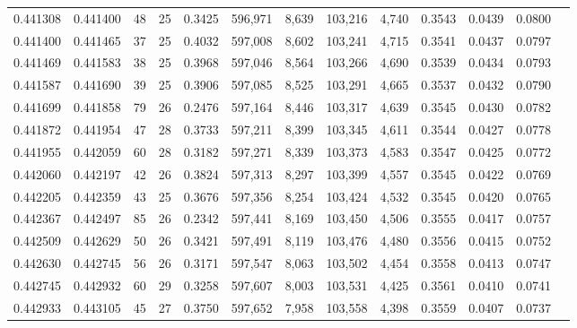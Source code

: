 \begin{tabular}{rrrrrrrrrrrrr}
0.441308 & 0.441400 &    48 &  25 &                                     0.3425 & 596,971 &   8,639 & 103,216 &   4,740 & 0.3543 & 0.0439 & 0.0800 \\
0.441400 & 0.441465 &    37 &  25 &                                     0.4032 & 597,008 &   8,602 & 103,241 &   4,715 & 0.3541 & 0.0437 & 0.0797 \\
0.441469 & 0.441583 &    38 &  25 &                                     0.3968 & 597,046 &   8,564 & 103,266 &   4,690 & 0.3539 & 0.0434 & 0.0793 \\
0.441587 & 0.441690 &    39 &  25 &                                     0.3906 & 597,085 &   8,525 & 103,291 &   4,665 & 0.3537 & 0.0432 & 0.0790 \\
0.441699 & 0.441858 &    79 &  26 &                                     0.2476 & 597,164 &   8,446 & 103,317 &   4,639 & 0.3545 & 0.0430 & 0.0782 \\
0.441872 & 0.441954 &    47 &  28 &                                     0.3733 & 597,211 &   8,399 & 103,345 &   4,611 & 0.3544 & 0.0427 & 0.0778 \\
0.441955 & 0.442059 &    60 &  28 &                                     0.3182 & 597,271 &   8,339 & 103,373 &   4,583 & 0.3547 & 0.0425 & 0.0772 \\
0.442060 & 0.442197 &    42 &  26 &                                     0.3824 & 597,313 &   8,297 & 103,399 &   4,557 & 0.3545 & 0.0422 & 0.0769 \\
0.442205 & 0.442359 &    43 &  25 &                                     0.3676 & 597,356 &   8,254 & 103,424 &   4,532 & 0.3545 & 0.0420 & 0.0765 \\
0.442367 & 0.442497 &    85 &  26 &                                     0.2342 & 597,441 &   8,169 & 103,450 &   4,506 & 0.3555 & 0.0417 & 0.0757 \\
0.442509 & 0.442629 &    50 &  26 &                                     0.3421 & 597,491 &   8,119 & 103,476 &   4,480 & 0.3556 & 0.0415 & 0.0752 \\
0.442630 & 0.442745 &    56 &  26 &                                     0.3171 & 597,547 &   8,063 & 103,502 &   4,454 & 0.3558 & 0.0413 & 0.0747 \\
0.442745 & 0.442932 &    60 &  29 &                                     0.3258 & 597,607 &   8,003 & 103,531 &   4,425 & 0.3561 & 0.0410 & 0.0741 \\
0.442933 & 0.443105 &    45 &  27 &                                     0.3750 & 597,652 &   7,958 & 103,558 &   4,398 & 0.3559 & 0.0407 & 0.0737 \\

\end{tabular}
